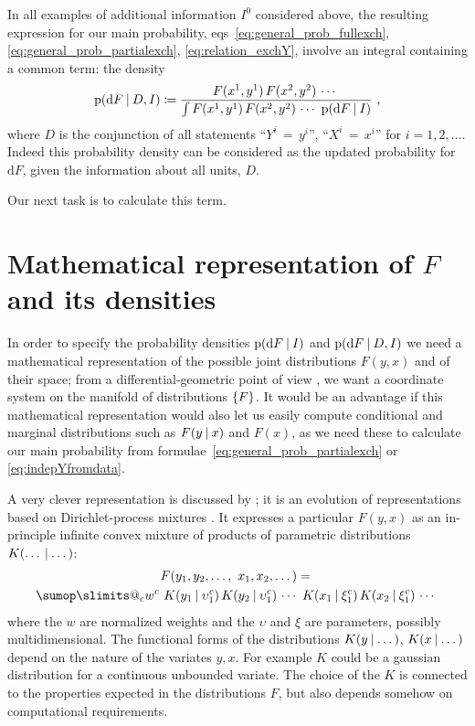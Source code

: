 \documentclass[\ifafour a4paper,12pt,\else a5paper,10pt,\fi%
onecolumn,oneside,article,%
british%
]{memoir}
\makeatletter
\theoremstyle{remark}
\theoremstyle{innote}
\def\sum{\DOTSI\sumop\slimits@}
\newcommand*{\di}{\mathrm{d}}%
\newcommand*{\defd}{\coloneqq}
\DeclarePairedDelimiter\set{\{}{\}} %
\newcommand*{\p}{\mathrm{p}}%
\renewcommand*{\|}[1][]{\nonscript\:#1\vert\nonscript\:\mathopen{}}
\newcommand*{\mo}[1][=]{\mathord{\,#1\,}}
\newcommand*{\eqns}{eqs}%
\newcommand*{\eg}{{e.g.}}
\newcommand*{\prop}[1]{\enquote{\textsf{#1}}}%
\makeatother
\begin{document}
In all examples of additional information $I^{0}$ considered above, the resulting expression for our main probability, \eqns~\eqref{eq:general_prob_fullexch}, \eqref{eq:general_prob_partialexch}, \eqref{eq:relation_exchY}, involve an integral containing a common term: the density
\begin{equation}
  \label{eq:common_density}
  \p(\di F \|D,I) \defd
    \frac{
    F(x^{1},y^{1})\,F(x^{2},y^{2})\,\dotsm\  
  }{
   \int F(x^{1},y^{1})\,F(x^{2},y^{2})\,\dotsm\  \p(\di F \|I)
  } \ ,
\end{equation}
where $D$ is the conjunction of all statements \prop{$Y^{i}\mo y^{i}$}, \prop{$X^{i}\mo x^{i}$} for $i=1,2,\dotsc$. Indeed this probability density can be considered as the updated probability for $\di F$, given the information about all units, $D$.

Our next task is to calculate this term.


\section{Mathematical representation of $F$ and its densities}
\label{sec:repr_density_F}

In order to specify the probability densities $\p(\di F \| I)$ and $\p(\di F \| D, I)$ we need a mathematical representation of the possible joint distributions $F(y,x)$ and of their space; from a differential-geometric point of view \autocites[III.A, VII.A]{choquetbruhatetal1977_r1996}, we want a coordinate system on the manifold of distributions $\set{F}$. It would be an advantage if this mathematical representation would also let us easily compute conditional and marginal distributions such as $F(y\| x)$ and $F(x)$, as we need these to calculate our main probability from formulae~\eqref{eq:general_prob_partialexch} or \eqref{eq:indepYfromdata}.

A very clever representation is discussed by \textcites{dunsonetal2011}\autocites[see also][]{bhattacharyaetal2012,rossi2014}; it is an evolution of representations based on Dirichlet-process mixtures \autocites[\eg][]{antoniak1974,ferguson1983,escobaretal1995,muelleretal1996,rasmussen1999}. It expresses a particular $F(y,x)$ as an in-principle infinite convex mixture of products of parametric distributions $K(\dotso \| \dotso)$:
\begin{multline}
  \label{eq:F_repres}
  F(y_{1},y_{2}, \dotsc,\ x_{1}, x_{2}, \dotsc) ={}\\
  \sum_{c} w^{c}\
  K(y_{1} \| \upsilon^{c}_{1})\,  K(y_{2} \| \upsilon^{c}_{1})\, \dotsm\ 
  K(x_{1} \| \xi^{c}_{1})\,  K(x_{2} \| \xi^{c}_{1})\, \dotsm\ 
\end{multline}
where the $w$ are normalized weights and the $\upsilon$ and $\xi$ are parameters, possibly multidimensional. The functional forms of the distributions $K(y \| \dotso)$, $K(x \| \dotso)$ depend on the nature of the variates $y,x$. For example $K$ could be a gaussian distribution for a continuous unbounded variate. The choice of the $K$ is connected to the properties expected in the distributions $F$, but also depends somehow on computational requirements.
\end{document}
